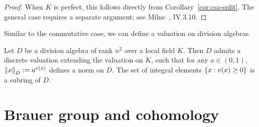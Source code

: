\begin{proof}
When $K$ is perfect, this follows directly from Corollary~\ref{cor:csa-split}. The general case requires a separate argument; see Milne~\cite{Mi08}, IV.3.10.
\end{proof}
Similar to the commutative case, we can define a valuation on division algebras.
\begin{pr}
Let $D$ be a division algebra of rank $n^2$ over a local field $K$. Then $D$ admits a discrete valuation extending the valuation on $K$, such that for any $a\in (0,1)$, $\left\Vert {x}\right\Vert_D:=a^{v(x)}$ defines a norm on $D$. The set of integral elements $\left\{{x}:{v(x)\ge 0}\right\}$ is a subring of $D$.
\end{pr}
\section{Brauer group and cohomology}
